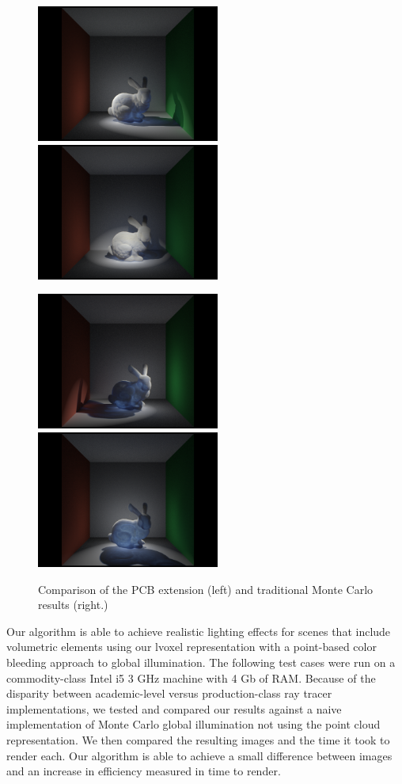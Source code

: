 \documentclass[12pt]{ucthesis}
\newcommand{\captionfonts}{\small\bf\ssp}
\begin{document}
\begin{figure}[h!]
\centering
    \includegraphics[width=60mm]{img/bunny_spot/spot_left.png}
    \includegraphics[width=60mm]{img/bunny_spot/spot_front.png}

    \includegraphics[width=60mm]{img/bunny_spot/spot_right.png}
    \includegraphics[width=60mm]{img/bunny_spot/spot_behind.png}
    \captionfonts
    \caption{Comparison of the PCB extension (left) and traditional Monte Carlo results (right.)}
\end{figure}

Our algorithm is able to achieve realistic lighting effects for scenes that include volumetric elements using our lvoxel representation with a point-based color bleeding approach to global illumination.
The following test cases were run on a commodity-class Intel i5 3 GHz machine with 4 Gb of RAM.  Because of the disparity between academic-level versus production-class ray tracer implementations, we tested and compared our results against a naive implementation of Monte Carlo global illumination not using the point cloud representation.  We then compared the resulting images and the time it took to render each.  Our algorithm is able to achieve a small difference between images and an increase in efficiency measured in time to render.
\end{document}
